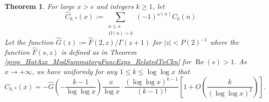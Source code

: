 \documentclass[11pt,reqno,a4letter]{article}
\numberwithin{figure}{section}
\numberwithin{table}{section}
\theoremstyle{plain}
\newtheorem{theorem}{Theorem}
\numberwithin{theorem}{section}
\theoremstyle{definition}
\renewcommand{\Re}{\operatorname{Re}}
\begin{document}
\begin{theorem} 
\label{theorem_CnkSpCasesScaledSummatoryFuncs} 
For large $x > e$ and integers $k \geq 1$, let 
\[
\widehat{C}_{k,\ast}(x) := \sum_{\substack{n \leq x \\ \Omega(n) = k}} 
     (-1)^{\omega(n)} C_k(n) 
\]
Let the function $\widehat{G}(z) := \widehat{F}(2, z) / \Gamma(z+1)$ for 
$|z| < P(2)^{-1}$ where the function $\widehat{F}(s, z)$ is defined as 
in Theorem \ref{prop_HatAzx_ModSummatoryFuncExps_RelatedToCkn} for $\Re(s) > 1$. 
As $x \rightarrow +\infty$, we have uniformly for any $1 \leq k \leq \log\log x$ that 
\[
\widehat{C}_{k,\ast}(x) = -\widehat{G}\left(-\frac{k-1}{\log\log x}\right) \frac{x}{\log x} \cdot 
     \frac{(\log\log x)^{k-1}}{(k-1)!} \left[ 
     1 + O\left(\frac{k}{(\log\log x)^2}\right)\right]. 
\]
\end{theorem} 
\end{document}
